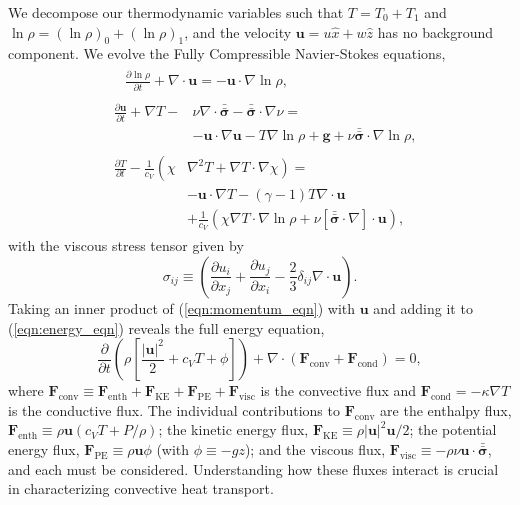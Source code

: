 \documentclass[aps, prl, twocolumn, nofootinbib, groupedaddress, amsfonts, amssymb, amsmath]{revtex4-1}
\newcommand{\Div}[1]{\ensuremath{\nabla\cdot\left( #1\right)}}
\newcommand{\grad}{\ensuremath{\nabla}}
\newcommand{\lilstressT}{\ensuremath{\bm{\bar{\bar{\sigma}}}}}
\begin{document}
We decompose our thermodynamic variables such that $T = T_0 + T_1$ and
$\ln\rho = (\ln\rho)_0 + (\ln\rho)_1$, and the velocity $\bm{u} = u\hat{x} + w\hat{z}$ has no
background component.    We evolve the Fully Compressible Navier-Stokes equations,
\begin{align}
&\begin{aligned}
&\frac{\partial \ln\rho}{\partial t} + \grad\cdot\bm{u} 
    = -\bm{u}\cdot\grad\ln\rho,
	\label{eqn:continuity_eqn}
\end{aligned}\\
&\begin{aligned}
\frac{\partial\bm{u}}{\partial t} + \grad T - 
&\nu\grad\cdot\lilstressT - \lilstressT\cdot\grad\nu = \\
&-\bm{u}\cdot\grad\bm{u} - T\grad\ln\rho + \bm{g} + 
\nu\lilstressT\cdot\grad\ln\rho,
\label{eqn:momentum_eqn}
\end{aligned}\\
&\begin{aligned}
\frac{\partial T}{\partial t} -\frac{1}{c_V}\left(\right.\chi&\left.
    \grad^2 T + \grad T\cdot\grad\chi\right) = \\
	&-\bm{u}\cdot\grad T - (\gamma-1)T\grad\cdot{\bm{u}} \\
	&+ \frac{1}{c_V}\left(\chi\grad T \cdot\grad\ln\rho +
	\nu\left[\lilstressT\cdot\nabla\right]\cdot\bm{u}\right), 
	\label{eqn:energy_eqn}
\end{aligned}
\end{align}
with the viscous stress tensor given by
\begin{equation}
\sigma_{ij} \equiv \left(\frac{\partial u_i}{\partial x_j} + 
\frac{\partial u_j}{\partial x_i} - \frac{2}{3}\delta_{ij}\grad\cdot\bm{u}\right).
	\label{eqn:stress_tensor}
\end{equation}
Taking an inner product of
(\ref{eqn:momentum_eqn}) with $\bm{u}$ and adding it to 
(\ref{eqn:energy_eqn}) reveals the full energy equation,
\begin{equation}
\frac{\partial}{\partial t}\left(\rho\left[\frac{|\bm{u}|^2}{2} + c_V T + \phi\right]\right) +
\Div{\bm{F}_{\text{conv}} + \bm{F}_{\text{cond}}} = 0,
	\label{eqn:energy_eqn_full}
\end{equation}
where
$
\bm{F}_{\text{conv}} \equiv \bm{F}_{\text{enth}} + \bm{F}_{\text{KE}} + \bm{F}_{\text{PE}} + \bm{F}_{\text{visc}}
$
is the convective flux and $\bm{F}_{\text{cond}} = -\kappa \grad T$
is the conductive flux.
The individual contributions to $\bm{F}_{\text{conv}}$ are the enthalpy flux, 
$\bm{F}_{\text{enth}} \equiv \rho\bm{u}(c_V T + P/\rho)$;
the kinetic energy flux, 
$\bm{F}_{\text{KE}} \equiv \rho|\bm{u}|^2\bm{u}/2$;
the potential energy flux,
$\bm{F}_{\text{PE}} \equiv \rho\bm{u}\phi$ (with $\phi \equiv -gz$);
and the viscous flux, 
$\bm{F}_{\text{visc}} \equiv -\rho\nu\bm{u}\cdot\lilstressT$, and each 
must be considered. 
Understanding how these fluxes interact  
is crucial in characterizing convective heat transport.
\end{document}
